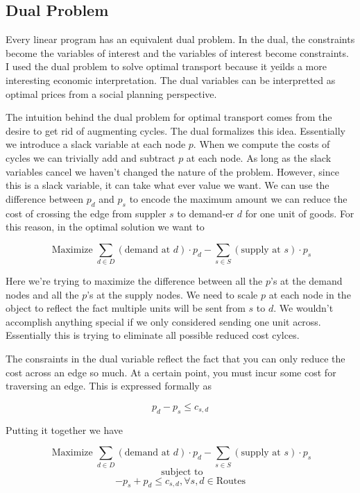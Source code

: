 \documentclass{report}
\begin{document}
\subsection{Dual Problem}

Every linear program has an equivalent dual problem. In the dual, the constraints become the variables of interest and the variables of interest become constraints. I used the dual problem to solve optimal transport because it yeilds a more interesting economic interpretation. The dual variables can be interpretted as optimal prices from a social planning perspective.

The intuition behind the dual problem for optimal transport comes from the desire to get rid of augmenting cycles. The dual formalizes this idea. Essentially we introduce a slack variable at each node $p$. When we compute the costs of cycles we can trivially add and subtract $p$ at each node. As long as the slack variables cancel we haven't changed the nature of the problem. However, since this is a slack variable, it can take what ever value we want. We can use the difference between $p_d$ and $p_s$ to encode the maximum amount we can reduce the cost of crossing the edge from suppler $s$ to demand-er $d$ for one unit of goods. For this reason, in the optimal solution we want to

$$\operatorname{Maximize} \sum_{d \in D}  (\text{demand at } d) \cdot p_{d} -   \sum_{s \in S}  (\text{supply at } s) \cdot p_{s} $$

Here we're trying to maximize the difference between all the $p$'s at the demand nodes and all the $p$'s at the supply nodes. We need to scale $p$ at each node in the object to reflect the fact multiple units will be sent from $s$ to $d$. We wouldn't accomplish anything special if we only considered sending one unit across. Essentially this is trying to eliminate all possible reduced cost cylces.

The consraints in the dual variable reflect the fact that you can only reduce the cost across an edge so much. At a certain point, you must incur some cost for traversing an edge. This is expressed formally as

$$ p_d -p_s  \leq c_{s,d}$$

Putting it together we have

$$\operatorname{Maximize} \sum_{d \in D}  (\text{demand at } d) \cdot p_{d} -   \sum_{s \in S}  (\text{supply at } s) \cdot p_{s} $$
$$ \text{ subject to}$$
$$ -p_s + p_d \leq c_{s,d}, \forall s,d\in \textrm{Routes}$$
\end{document}
